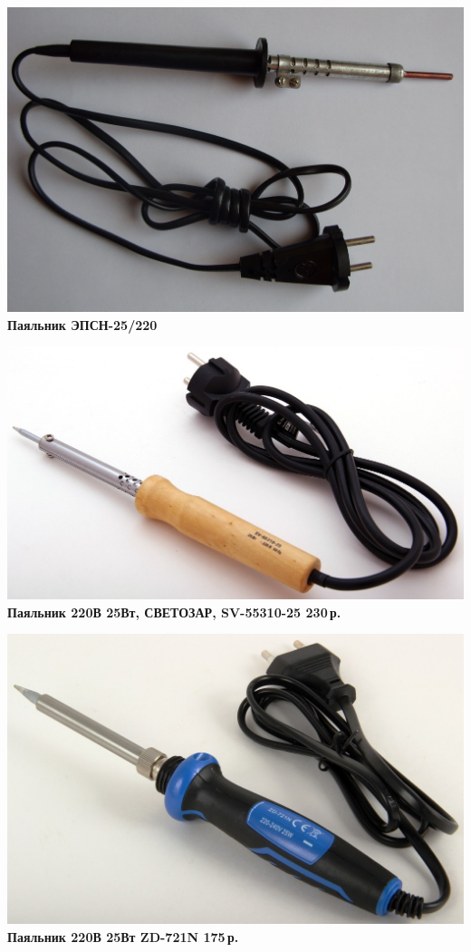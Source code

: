 \documentclass{magazine}
\begin{document}
{

\noindent\includegraphics[width=\columnwidth]{fig/00/EPSN25.jpg}
\textbf{Паяльник ЭПСН-25/220}

\noindent\href{http://voltmaster-samara.ru/catalog/product/00067650/}{
\includegraphics[width=\columnwidth]{fig/00/SV-55310-25.jpg}}
\textbf{Паяльник 220В 25Вт, СВЕТОЗАР, SV-55310-25 230\,р.}

\noindent\href{http://voltmaster-samara.ru/catalog/product/00091478/}{
\includegraphics[width=\columnwidth]{fig/00/ZD-721N.jpg}}
\textbf{Паяльник 220В 25Вт ZD-721N 175\,р.}

}
\end{document}
